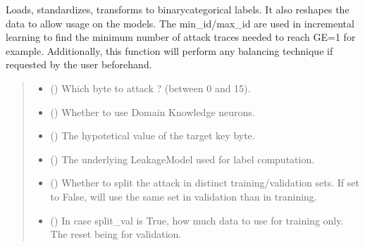 \documentclass[letterpaper,10pt,english]{sphinxmanual}
\begin{document}
\begin{fulllineitems}
\begin{fulllineitems}
\sphinxAtStartPar
Loads, standardizes, transforms to binary\sphinxhyphen{}categorical labels. It also reshapes the
data to allow usage on the models. The min\_id/max\_id are used in incremental learning
to find the minimum number of attack traces needed to reach GE=1 for example.
Additionally, this function will perform any balancing technique if requested by the
user beforehand.
\begin{quote}\begin{description}
\begin{itemize}
\item {} 
\sphinxAtStartPar
{} () \textendash{} Which byte to attack ? (between 0 and 15).

\item {} 
\sphinxAtStartPar
{} () \textendash{} Whether to use Domain Knowledge neurons.

\item {} 
\sphinxAtStartPar
{} () \textendash{} The hypotetical value of the target key byte.

\item {} 
\sphinxAtStartPar
{} ({\hyperref[\detokenize{MLSCAlib.Ciphers:MLSCAlib.Ciphers.leakage_model.LeakageModel}]{}}) \textendash{} The underlying LeakageModel used for label computation.

\item {} 
\sphinxAtStartPar
{} (\sphinxstyleliteralemphasis{\sphinxupquote{, }}) \textendash{} Whether to split the attack in distinct training/validation sets. If set to
False, will use the same set in validation than in tranining.

\item {} 
\sphinxAtStartPar
{} (\sphinxstyleliteralemphasis{\sphinxupquote{, }}) \textendash{} In case split\_val is True, how much data to use for training only. The reset
being for validation.


\end{itemize}
\end{description}
\end{quote}
\end{fulllineitems}
\end{fulllineitems}
\end{document}
